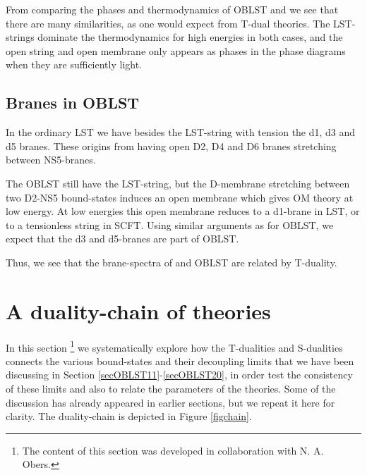 \documentclass[a4paper,twoside,titlepage,12pt]{article}
\begin{document}
From comparing the phases and thermodynamics of \coordHE{} OBLST and
\coordHE{} we see that there are many similarities, as one would expect
from T-dual theories. 
The LST-strings dominate the thermodynamics for high energies
in both cases, and the open string and open membrane only appears
as phases in the phase diagrams when they are sufficiently light. 


\subsection{Branes in \coordHE{} OBLST}

In the ordinary \coordHE{} LST we have besides the LST-string with
tension \coordHE{} the d1, d3 and d5 branes\cite{Losev:1997hx}.
These origins from having open D2, D4 and D6 branes
stretching between NS5-branes.

The \coordHE{} OBLST still have the LST-string, but the
D-membrane stretching between two D2-NS5 bound-states induces
an open membrane which gives OM theory at low energy. 
At low energies this open membrane reduces to a d1-brane
in \coordHE{} LST, or to a tensionless string in \coordHE{} SCFT.
Using similar arguments as for \coordHE{} OBLST, we
expect that the d3 and d5-branes are part of \coordHE{} OBLST.

Thus, we see that the brane-spectra of \coordHE{} and \coordHE{} OBLST
are related by T-duality. 

\section{A duality-chain of theories}
\label{secchain}

In this section%
\footnote{The content of this section was developed 
in collaboration with N. A. Obers.}
we systematically explore how the T-dualities and
S-dualities connects the various bound-states and their
decoupling limits that we have been discussing in 
Section \ref{secOBLST11}-\ref{secOBLST20}, 
in order test the consistency of these limits and also to relate
the parameters of the theories.
Some of the discussion has already appeared in earlier sections,
but we repeat it here for clarity.
The duality-chain is depicted in Figure \ref{figchain}.
\end{document}

